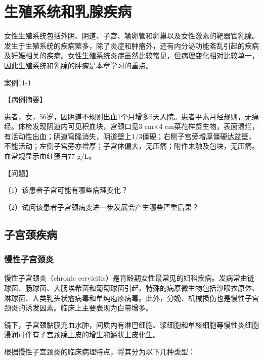 \chapter{生殖系统和乳腺疾病}


女性生殖系统包括外阴、阴道、子宫、输卵管和卵巢以及女性激素的靶器官乳腺。发生于生殖系统的疾病繁多，除了炎症和肿瘤外，还有内分泌功能紊乱引起的疾病及妊娠相关的疾病。女性生殖系统炎症虽然比较常见，但病理变化相对比较单一，因此生殖系统和乳腺的肿瘤是本章学习的重点。

\begin{framed}
{案例11-1}

{【病例摘要】}

患者，女，56岁，因阴道不规则出血1个月增多5天入院。患者平素月经规则，无痛经。体检发现阴道内可见积血块，宫颈口见3
cm×4
cm菜花样赘生物，表面溃烂，有活动性出血；阴道穹隆消失，阴道壁上1/3僵硬；右侧子宫旁增厚僵硬达盆壁，不能活动；左侧子宫旁亦增厚；子宫体偏大，无压痛；附件未触及包块，无压痛。血常规显示血红蛋白77
g/L。

{【问题】}

（1）该患者子宫可能有哪些病理变化？

（2）试问该患者子宫颈病变进一步发展会产生哪些严重后果？
\end{framed}

\section{子宫颈疾病}

\subsection{慢性子宫颈炎}

慢性子宫颈炎（chronic
cervicitis）是育龄期女性最常见的妇科疾病。发病常由链球菌、肠球菌、大肠埃希菌和葡萄球菌引起，特殊的病原微生物包括沙眼衣原体、淋球菌、人类乳头状瘤病毒和单纯疱疹病毒。此外，分娩、机械损伤也是慢性子宫颈炎的诱发因素。临床上主要表现为白带增多。

镜下，子宫颈黏膜充血水肿，间质内有淋巴细胞、浆细胞和单核细胞等慢性炎细胞浸润可伴有子宫颈腺上皮的增生和鳞状上皮化生。

根据慢性子宫颈炎的临床病理特点，将其分为以下几种类型：

